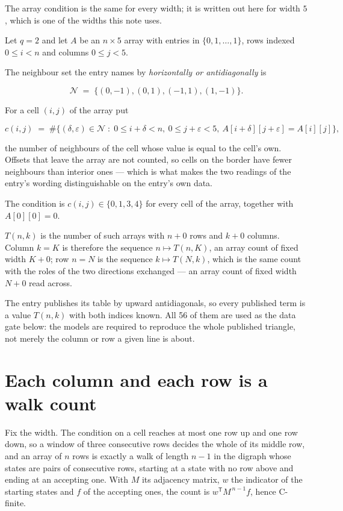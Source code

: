 \documentclass[11pt]{article}
\theoremstyle{definition}
\begin{document}
The array condition is the same for every width; it is written out here for width $5$, which is one of the widths this note uses.

Let $q = 2$ and let $A$ be an $n \times 5$ array with entries in $\{0,1,\dots,1\}$, rows indexed $0 \le i < n$ and columns $0 \le j < 5$.

The neighbour set the entry names by {\itshape horizontally or antidiagonally} is

\[\mathcal{N} \;=\; \{(0,-1), (0,1), (-1,1), (1,-1)\}.\]

For a cell $(i,j)$ of the array put

\[c(i,j) \;=\; \#\bigl\{(\delta,\varepsilon)\in\mathcal{N} \;:\; 0\le i+\delta<n,\ 0\le j+\varepsilon<5,\ A[i+\delta][j+\varepsilon] = A[i][j]\bigr\},\]

the number of neighbours of the cell whose value is equal to the cell's own. Offsets that leave the array are not counted, so cells on the border have fewer neighbours than interior ones --- which is what makes the two readings of the entry's wording distinguishable on the entry's own data.

The condition is $c(i,j) \in \{0, 1, 3, 4\}$ for every cell of the array, together with $A[0][0]=0$.

$T(n,k)$ is the number of such arrays with $n + 0$ rows and $k + 0$ columns. Column $k = K$ is therefore the sequence $n \mapsto T(n,K)$, an array count of fixed width $K + 0$; row $n = N$ is the sequence $k \mapsto T(N,k)$, which is the same count with the roles of the two directions exchanged --- an array count of fixed width $N + 0$ read across.

The entry publishes its table by upward antidiagonals, so every published term is a value $T(n,k)$ with both indices known. All 56 of them are used as the data gate below: the models are required to reproduce the whole published triangle, not merely the column or row a given line is about.

\section{Each column and each row is a walk count}

Fix the width. The condition on a cell reaches at most one row up and one row down, so a window of three consecutive rows decides the whole of its middle row, and an array of $n$ rows is exactly a walk of length $n-1$ in the digraph whose states are pairs of consecutive rows, starting at a state with no row above and ending at an accepting one. With $M$ its adjacency matrix, $w$ the indicator of the starting states and $f$ of the accepting ones, the count is $w^{\mathsf T}M^{\,n-1}f$, hence C-finite.
\end{document}
